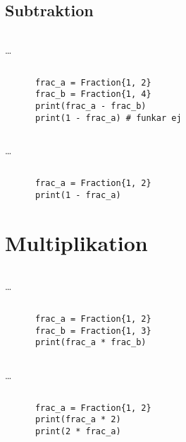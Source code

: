 \subsection{Subtraktion}

\begin{frame}[fragile]
  \inputminted[linenos,firstline=3,lastline=3]{python}{examples/myfrac_sub.py}
  \dots
  \inputminted[autogobble=false,linenos,firstline=47,lastline=48]{python}{examples/myfrac_sub.py}

  \begin{example}
    \begin{verbatim}
      frac_a = Fraction{1, 2}
      frac_b = Fraction{1, 4}
      print(frac_a - frac_b)
      print(1 - frac_a) # funkar ej
    \end{verbatim}
  \end{example}
\end{frame}

\begin{frame}[fragile]
  \inputminted[linenos,firstline=3,lastline=3]{python}{examples/myfrac_sub.py}
  \dots
  \inputminted[autogobble=false,linenos,firstline=50,lastline=51]{python}{examples/myfrac_sub.py}

  \begin{example}
    \begin{verbatim}
      frac_a = Fraction{1, 2}
      print(1 - frac_a)
    \end{verbatim}
  \end{example}
\end{frame}


\section{Multiplikation}

\begin{frame}[fragile]
  \inputminted[linenos,firstline=3,lastline=3]{python}{examples/myfrac_mul.py}
  \dots
  \inputminted[autogobble=false,linenos,firstline=53,lastline=59]{python}{examples/myfrac_mul.py}

  \begin{example}
    \begin{verbatim}
      frac_a = Fraction{1, 2}
      frac_b = Fraction{1, 3}
      print(frac_a * frac_b)
    \end{verbatim}
  \end{example}
\end{frame}

\begin{frame}[fragile]
  \inputminted[linenos,firstline=3,lastline=3]{python}{examples/myfrac_mul.py}
  \dots
  \inputminted[autogobble=false,linenos,firstline=61,lastline=62]{python}{examples/myfrac_mul.py}

  \begin{example}
    \begin{verbatim}
      frac_a = Fraction{1, 2}
      print(frac_a * 2)
      print(2 * frac_a)
    \end{verbatim}
  \end{example}
\end{frame}


